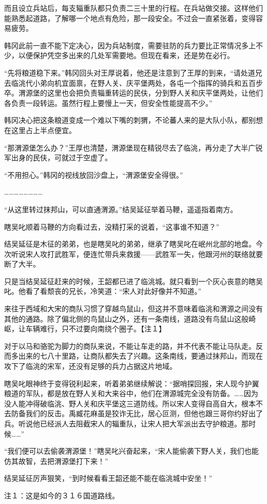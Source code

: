 而且设立兵站后，每支辎重队都只负责二三十里的行程。在兵站做交接。这样他们能熟悉起道路，了解哪一个地点有危险，那一段安全。不过会一直紧张着，变得容易疲劳。

韩冈此前一直不能下定决心，因为兵站制度，需要驻防的兵力要比正常情况多上不少，以便保护凭空多出来的几处军需要地。但现在看来，还是势在必行。

“先将粮道稳下来。”韩冈回头对王厚说着，他还是注意到了王厚的到来，“请处道兄去临洮代小弟向机宜面禀，在野人关、庆平堡两处，各屯一个指挥的骑兵和五百步卒。渭源堡的这里也会把负责辎重转运的民伕，分到野人关和庆平堡两处，让他们各负责一段转运。虽然行程上要慢上一天，但安全性能提高不少。”

韩冈决心把这条粮道变成一个难以下嘴的刺猬，不论蕃人来的是大队小队，都别想在这里占上半点便宜。

“那渭源堡怎么办？”王厚也清楚，渭源堡现在精锐尽去了临洮，再分走了大半广锐军出身的民伕，可就过于空虚了。

“不用担心。”韩冈的视线放回沙盘上，“渭源堡安全得很。”

……………………

“从这里转过抹邦山，可以直通渭源。”结吴延征举着马鞭，遥遥指着南方。

瞎吴叱顺着马鞭的方向看过去，没精打采的说着，“这事谁不知道？”

结吴延征是木征的弟弟，也是瞎吴叱的弟弟，继承了瞎吴叱在岷州北部的地盘。今次听说宋人攻打武胜军，便连忙带兵来救援——武胜军一失，他跟河州的联络就要断了大半。

只是当结吴延征赶来的时候，王韶都已进了临洮城。就只看到一个灰心丧意的瞎吴叱。他看了看颓丧的兄长，冷笑道：“宋人对此好像并不知道。”

来往于西域和大宋的商队习惯了穿越鸟鼠山，但这并不意味着临洮和渭源之间没有其他的通路。除了偏北侧的鸟鼠山之外，还有一条南线，道路没有鸟鼠山这般崎岖，让车辆难行，只不过要向南绕个圈子。【注１】

对于以马和骆驼为脚力的商队来说，不能让车走的路，并不代表不能让马队走。反而多出来的七八十里路，让商队都失去了兴趣。这条南线，要通过抹邦山，而现在攻下了临洮的宋军，还没有足够的兵力占据这片地域。

瞎吴叱眼神终于变得锐利起来，听着弟弟继续解说：“据哨探回报，宋人现今护翼粮道的军队，都是放在野人关和大来谷中，他们在渭源城完全没有防备。……因为没人能冲得破临洮、野人关和庆平堡这三道防线。所以宋人变得自高自大，根本不去防备我们的反击。禹臧花麻虽是狡诈无比，居心叵测，但他也跟三哥你约好出了兵。听说他已经派人去阻截宋人的辎重队，让宋人把大军派出去守护粮道。那时候……”

“我们便可以去偷袭渭源堡！”瞎吴叱兴奋起来，“宋人能偷袭下野人关，我们也能仿其故智，去把渭源堡打下来！”

结吴延征厉声狠笑，“到时候看看王韶还能不能在临洮城中安坐！”

注１：这是如今的３１６国道路线。

